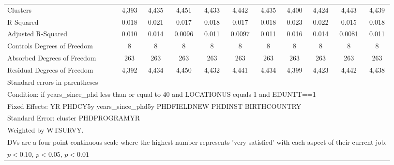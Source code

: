 \begin{table}[htbp]
\begin{tabular}{l*{10}{c}}
Clusters&       4,393         &       4,435         &       4,451         &       4,433         &       4,442         &       4,435         &       4,400         &       4,424         &       4,443         &       4,439         \\
R-Squared&       0.018         &       0.021         &       0.017         &       0.018         &       0.017         &       0.018         &       0.023         &       0.022         &       0.015         &       0.018         \\
Adjusted R-Squared&       0.010         &       0.014         &      0.0096         &       0.011         &      0.0097         &       0.011         &       0.016         &       0.014         &      0.0081         &       0.011         \\
Controls Degrees of Freedom&           8         &           8         &           8         &           8         &           8         &           8         &           8         &           8         &           8         &           8         \\
Absorbed Degrees of Freedom&         263         &         263         &         263         &         263         &         263         &         263         &         263         &         263         &         263         &         263         \\
Residual Degrees of Freedom&       4,392         &       4,434         &       4,450         &       4,432         &       4,441         &       4,434         &       4,399         &       4,423         &       4,442         &       4,438         \\
\hline\hline
\multicolumn{11}{l}{\footnotesize Standard errors in parentheses}\\
\multicolumn{11}{l}{\footnotesize Condition: if years\_since\_phd less than or equal to 40 and LOCATIONUS equals 1 and EDUNTT==1}\\
\multicolumn{11}{l}{\footnotesize Fixed Effects: YR PHDCY5y years\_since\_phd5y PHDFIELDNEW PHDINST BIRTHCOUNTRY}\\
\multicolumn{11}{l}{\footnotesize Standard Error: cluster PHDPROGRAMYR}\\
\multicolumn{11}{l}{\footnotesize Weighted by WTSURVY.}\\
\multicolumn{11}{l}{\footnotesize DVs are a four-point continuous scale where the highest number represents 'very satisfied' with each aspect of their current job.}\\
\multicolumn{11}{l}{\footnotesize \sym{*} \(p<0.10\), \sym{**} \(p<0.05\), \sym{***} \(p<0.01\)}\\
\end{tabular}
\end{table}
